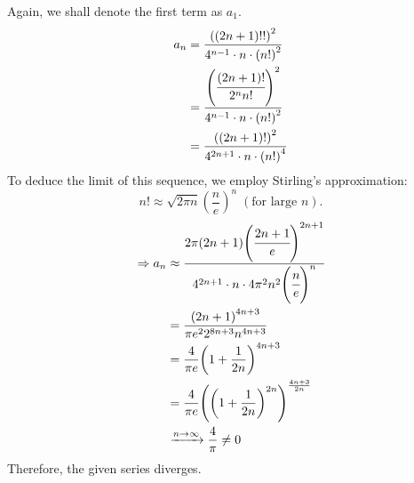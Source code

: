 \item

Again, we shall denote the first term as $a_1$.
\begin{align*}
	a_n
	 & = \frac{{\left( (2n + 1)!! \right)}^2}{4^{n - 1} \cdot n \cdot {(n!)}^2}                 \\
	 & = \cfrac{{\left( \cfrac{(2n + 1)!}{2^n n!} \right)}^2}{4^{n - 1} \cdot n \cdot {(n!)}^2} \\
	 & = \frac{{\left( (2n + 1)! \right)}^2}{4^{2n + 1} \cdot n \cdot {(n!)}^4}
\end{align*}
To deduce the limit of this sequence, we employ Stirling's approximation:
\[
	n! \approx \sqrt{2\pi n} {\left( \frac{n}{e} \right)}^n \;(\text{for large $n$}).
\]
\begin{align*}
	\Rightarrow a_n
	 & \approx \cfrac{
	2\pi (2n + 1) {\left( \cfrac{2n + 1}{e} \right)}^{2n + 1}
	}{
	4^{2n + 1} \cdot n \cdot 4\pi^2 n^2 {\left( \cfrac{n}{e} \right)}^n
	}                                                                                                \\
	 & = \frac{
		{(2n + 1)}^{4n + 3}
	}{\pi e^2 2^{8n + 3} n^{4n + 3}}                                                                 \\
	 & = \frac{4}{\pi e} {\left( 1 + \frac{1}{2n} \right)}^{4n + 3}                                  \\
	 & = \frac{4}{\pi e} {\left( {\left( 1 + \frac{1}{2n} \right)}^{2n} \right)}^{\frac{4n + 3}{2n}} \\
	 & \xrightarrow{n \rightarrow \infty} \frac{4}{\pi} \neq 0
\end{align*}
Therefore, the given series diverges.
